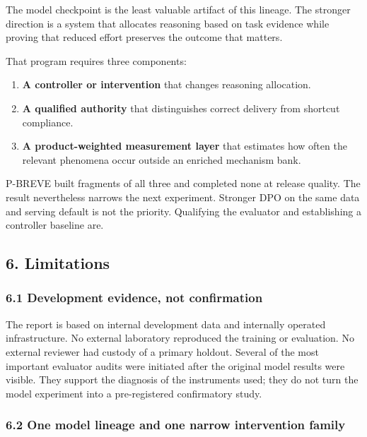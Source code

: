 \documentclass[
]{article}
\newcounter{none} %
\providecommand{\tightlist}{%
  \setlength{\itemsep}{0pt}\setlength{\parskip}{0pt}}
\begin{document}
The model checkpoint is the least valuable artifact of this lineage. The
stronger direction is a system that allocates reasoning based on task
evidence while proving that reduced effort preserves the outcome that
matters.

That program requires three components:

\begin{enumerate}
\def\labelenumi{\arabic{enumi}.}
\tightlist
\item
  \textbf{A controller or intervention} that changes reasoning
  allocation.
\item
  \textbf{A qualified authority} that distinguishes correct delivery
  from shortcut compliance.
\item
  \textbf{A product-weighted measurement layer} that estimates how often
  the relevant phenomena occur outside an enriched mechanism bank.
\end{enumerate}

P-BREVE built fragments of all three and completed none at release
quality. The result nevertheless narrows the next experiment. Stronger
DPO on the same data and serving default is not the priority. Qualifying
the evaluator and establishing a controller baseline are.

\subsection{6. Limitations}\label{6-limitations}

\subsubsection{6.1 Development evidence, not
confirmation}\label{61-development-evidence-not-confirmation}

The report is based on internal development data and internally operated
infrastructure. No external laboratory reproduced the training or
evaluation. No external reviewer had custody of a primary holdout.
Several of the most important evaluator audits were initiated after the
original model results were visible. They support the diagnosis of the
instruments used; they do not turn the model experiment into a
pre-registered confirmatory study.

\subsubsection{6.2 One model lineage and one narrow intervention
family}\label{62-one-model-lineage-and-one-narrow-intervention-family}
\end{document}
